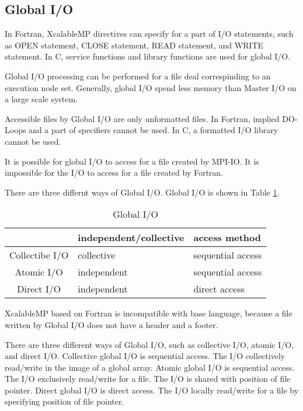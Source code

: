   \subsection{Global I/O}

  In Fortran, XcalableMP directives can specify for a part of I/O
  statements, such as OPEN statement, CLOSE statement, READ statement,
  and WRITE statement. 
  In C, service functions and library functions are used for global I/O.

  Global I/O processing can be performed for a file deal correspinding
  to an execution node set.
  Generally, global I/O spend less memory than Master I/O on a large
  scale system.

  Accessible files by Global I/O are only unformatted files. In Fortran,
  implied DO-Loops and a part of specifiers cannot be used.
  In C, a formatted I/O library cannot be used.

  It is possible for global I/O to access for a file created by
  MPI-IO. It is impossible for the I/O to access for a file created by
  Fortran.

  There are three differnt ways of Global I/O. Global I/O is shown in
  Table \ref{tb:global}. 

  \begin{table}[tb]
   \begin{center}
    \caption{Global I/O}
    \label{tb:global}
    \begin{tabular}{|c||l|l|}
     \hline 
     & independent/collective & access method  \\ \hline \hline
     Collectibe I/O & collective & sequential access \\ \hline
     Atomic I/O & independent & sequential access \\ \hline
     Direct I/O & independent & direct access \\ \hline
    \end{tabular}
   \end{center}
  \end{table}
  
  XcalableMP based on Fortran is incompatible with base language,
  because a file written by Global I/O does not have a header and a
  footer.

  There  are three different ways of Global I/O, such as collective
  I/O, atomic I/O, and direct I/O.
  Collective global I/O is sequential access.
  The I/O collectively read/write in the image of a global array.
  Atomic global I/O is sequential access.
  The I/O exclusively read/write for a file. The I/O is shared with
  position of file pointer.
  Direct global I/O is direct access.
  The I/O locally read/write for a file by specifying position of file
  pointer.

